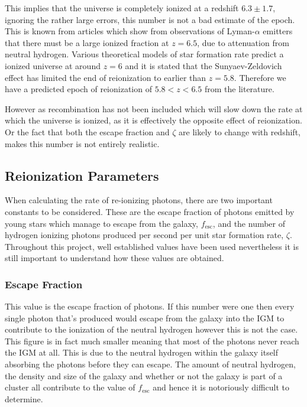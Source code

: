 	This implies that the universe is completely ionized at a redshift $6.3\pm1.7$, ignoring the rather large errors, this number is not a bad estimate of the epoch. This is known from articles which show from observations of Lyman-$\alpha$ emitters that there must be a large ionized fraction at $z=6.5$, due to attenuation from neutral hydrogen\cite{Ota:arXiv0707.1561}. Various theoretical models of star formation rate predict a ionized universe at around $z=6$ and it is stated that the Sunyaev-Zeldovich effect has limited the end of reionization to earlier than $z=5.8$\cite{2012MNRAS.423..862K}. Therefore we have a predicted epoch of reionization of $5.8<z<6.5$ from the literature.

	However as recombination has not been included which will slow down the rate at which the universe is ionized, as it is effectively the opposite effect of reionization. Or the fact that both the escape fraction and $\zeta$ are likely to change with redshift, makes this number is not entirely realistic.

	\subsection{Reionization Parameters} %
	\label{sub:reionization_parameters}
		When calculating the rate of re-ionizing photons, there are two important constants to be considered. These are the escape fraction of photons emitted by young stars which manage to escape from the galaxy, $f_\text{esc}$, and the number of hydrogen ionizing photons produced per second per unit star formation rate, $\zeta$. Throughout this project, well established values have been used nevertheless it is still important to understand how these values are obtained.

		\subsubsection{Escape Fraction} %
		\label{sub:escape_fraction}
			This value is the escape fraction of photons. If this number were one then every single photon that's produced would escape from the galaxy into the IGM to contribute to the ionization of the neutral hydrogen however this is not the case. This figure is in fact much smaller meaning that most of the photons never reach the IGM at all. This is due to the neutral hydrogen within the galaxy itself absorbing the photons before they can escape. The amount of neutral hydrogen, the density and size of the galaxy and whether or not the galaxy is part of a cluster all contribute to the value of $f_\text{esc}$ and hence it is notoriously difficult to determine.

